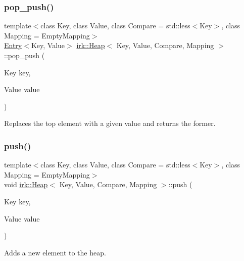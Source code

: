 \subsubsection{\texorpdfstring{pop\+\_\+push()}{pop\_push()}}
{\footnotesize\ttfamily template$<$class Key, class Value, class Compare = std\+::less$<$\+Key$>$, class Mapping = Empty\+Mapping$>$ \\
\mbox{\hyperlink{structirk_1_1Entry}{Entry}}$<$Key, Value$>$ \mbox{\hyperlink{classirk_1_1Heap}{irk\+::\+Heap}}$<$ Key, Value, Compare, Mapping $>$\+::pop\+\_\+push (\begin{DoxyParamCaption}\item[{Key}]{key,  }\item[{Value}]{value }\end{DoxyParamCaption})\hspace{0.3cm}{\ttfamily [inline]}}



Replaces the top element with a given value and returns the former. 

\mbox{\label{classirk_1_1Heap_aea9e1721c784b5d6c337e8792bd25676}} 
\subsubsection{\texorpdfstring{push()}{push()}}
{\footnotesize\ttfamily template$<$class Key, class Value, class Compare = std\+::less$<$\+Key$>$, class Mapping = Empty\+Mapping$>$ \\
void \mbox{\hyperlink{classirk_1_1Heap}{irk\+::\+Heap}}$<$ Key, Value, Compare, Mapping $>$\+::push (\begin{DoxyParamCaption}\item[{Key}]{key,  }\item[{Value}]{value }\end{DoxyParamCaption})\hspace{0.3cm}{\ttfamily [inline]}}



Adds a new element to the heap. 

\mbox{\label{classirk_1_1Heap_a0ccdd3050451a474e371c4e713b6b0d3}} 
